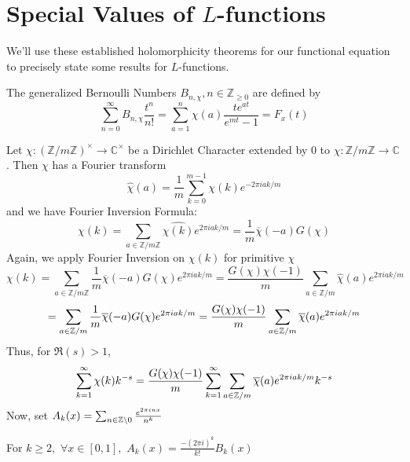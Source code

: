 \section{Special Values of $L$-functions}
We'll use these established holomorphicity theorems for our functional equation to precisely state some results 
for $L$-functions.
\begin{definition}
    The generalized Bernoulli Numbers $B_{n,\chi}, n\in\mathbb{Z}_{\geq 0}$ are defined 
    by 
    \[
        \sum_{n=0}^{\infty}B_{n,\chi}\frac{t^n}{n!} = \sum_{a=1}^n\chi(a)\frac{te^{at}}{e^{mt}-1} 
        =F_x(t) 
    \]
\end{definition}
Let $\chi:(\mathbb{Z}/m\mathbb{Z})^{\times}\rightarrow \mathbb{C}^{\times}$ be a Dirichlet Character
extended by 0 to $\chi:\mathbb{Z}/m\mathbb{Z}\rightarrow \mathbb{C}$. Then $\chi$ has a
Fourier transform 
\[
    \hat{\chi}(a)=\frac{1}{m}\sum_{k=0}^{m-1}\chi(k)e^{-2\pi iak/m}  
\]
and we have Fourier Inversion Formula: 
\[
    {\chi}(k)=\sum_{a\in\mathbb{Z}/m\mathbb{Z}}\hat{\chi(k)}e^{2\pi iak/m}=\frac{1}{m}
    \overline{\chi}(-a)G(\chi)  
\]
Again, we apply Fourier Inversion on $\chi(k)$ for primitive $\chi$ 
\[
    \chi(k)=\sum_{a\in\mathbb{Z}/{m}\mathbb{Z}}\frac{1}{m}\overline{\chi}(-a)G(\chi)e^{2\pi iak/m}
    =\frac{G(\chi)\chi(-1)}{m}\sum_{a\in\mathbb{Z}/m}\hat{\chi}(a)e^{2\pi iak/m}
\]
\[
    =\sum_{a\in\mathbb{Z}/m}\frac{1}{m}\overline{\chi}(-a)G(\chi)e^{2\pi iak/m}
    =\frac{G(\chi)\chi(-1)}{m}\sum_{a\in \mathbb{Z}/m}\overline{\chi}(a)e^{2\pi iak/m}
\]  
Thus, for $\Re(s)>1$,
\[
    \sum_{k=1}^{\infty}\chi(k)k^{-s}=\frac{G(\chi)\chi(-1)}{m}\sum_{k=1}^{\infty}\sum_{a\in\mathbb{Z}/m}
    \overline{\chi}(a)e^{2\pi iak/m}k^{-s}  
\]
Now, set $A_k(x)=\sum_{n\in\mathbb{Z}\backslash 0}\frac{e^{2\pi inx}}{n^k}$
\begin{claim}
    For $k\geq 2,$ $\forall x\in[0,1],$ $A_k(x)=\frac{-(2\pi i)^k}{k!}B_k(x)$
\end{claim}

